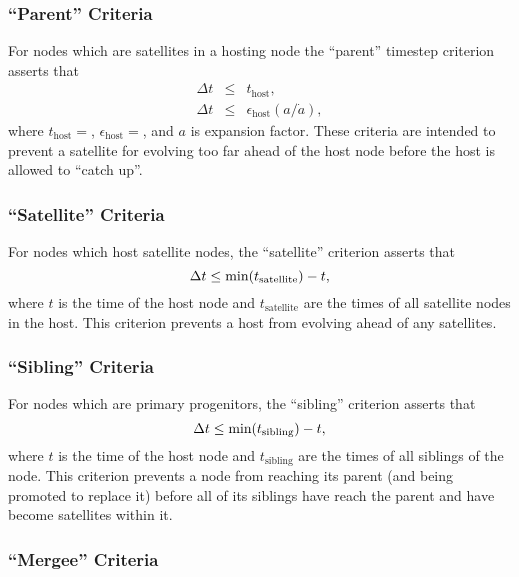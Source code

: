 \subsubsection{``Parent'' Criteria}

For \glspl{node} which are satellites in a hosting \gls{node} the ``\gls{parent}'' timestep criterion asserts that
\begin{eqnarray}
\Delta t &\le& t_\mathrm{host}, \\
\Delta t &\le& \epsilon_\mathrm{host} (a/\dot{a}),
\end{eqnarray}
where $t_\mathrm{host}=${\normalfont \ttfamily [timestepHostAbsolute]}, $\epsilon_\mathrm{host}=${\normalfont \ttfamily [timestepHostRelative]}, and $a$ is expansion factor. These criteria are intended to prevent a satellite for evolving too far ahead of the host node before the host is allowed to ``catch up''.

\subsubsection{``Satellite'' Criteria}

For \glspl{node} which host satellite \glspl{node}, the ``satellite'' criterion asserts that
\begin{equation}
 \Delta t \le \hbox{min}(t_\mathrm{satellite}) - t,
\end{equation}
where $t$ is the time of the host \gls{node} and $t_\mathrm{satellite}$ are the times of all satellite \glspl{node} in the host. This criterion prevents a host from evolving ahead of any satellites.

\subsubsection{``Sibling'' Criteria}

For \glspl{node} which are \glspl{primary progenitor}, the ``sibling'' criterion asserts that
\begin{equation}
 \Delta t \le \hbox{min}(t_\mathrm{sibling}) - t,
\end{equation}
where $t$ is the time of the host \gls{node} and $t_\mathrm{sibling}$ are the times of all siblings of the \gls{node}. This criterion prevents a \gls{node} from reaching its \gls{parent} (and being promoted to replace it) before all of its siblings have reach the \gls{parent} and have become satellites within it.

\subsubsection{``Mergee'' Criteria}


